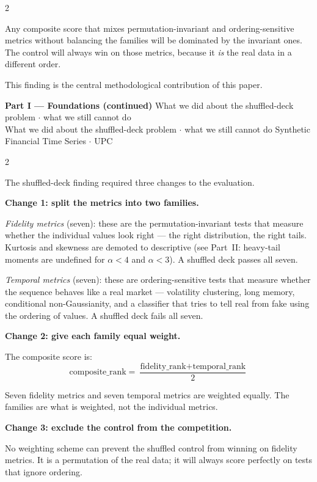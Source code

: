 \documentclass[10pt]{article}
\newcommand{\tealbox}[2]{\begin{tcolorbox}[mybox={Teal}{LBg},title={#1}]#2\end{tcolorbox}}
\newcommand{\pagehead}[2]{%
  \begin{tcolorbox}[enhanced,arc=0pt,outer arc=0pt,boxrule=0pt,
    colback=Navy,colframe=Navy,
    top=5pt,bottom=5pt,left=8pt,right=8pt,
    before skip=0pt,after skip=10pt]
  {\color{white}\large\bfseries #1}%
  \ifx\relax#2\relax\else\\[1pt]{\color{blue!30!white}\small #2}\fi
  \hfill{\color{blue!20!white}\footnotesize Synthetic Financial Time Series $\cdot$ UPC}
  \end{tcolorbox}}
\begin{document}
\begin{multicols}{2}
{Any composite score that mixes permutation-invariant and ordering-sensitive metrics without balancing the families will be dominated by the invariant ones. The control will always win on those metrics, because it \emph{is} the real data in a different order.

\smallskip
This finding is the central methodological contribution of this paper.}

\end{multicols}

\clearpage

\pagehead{Part I --- Foundations (continued)}
         {What we did about the shuffled-deck problem $\cdot$ what we still cannot do}

\begin{multicols}{2}

\tealbox{8\quad What We Did About It}{%
The shuffled-deck finding required three changes to the evaluation.

\medskip
\textbf{Change 1: split the metrics into two families.}

\textit{Fidelity metrics} (seven): these are the permutation-invariant tests that measure whether the individual values look right --- the right distribution, the right tails. Kurtosis and skewness are demoted to descriptive (see Part~II: heavy-tail moments are undefined for $\alpha < 4$ and $\alpha < 3$). A shuffled deck passes all seven.

\textit{Temporal metrics} (seven): these are ordering-sensitive tests that measure whether the sequence behaves like a real market --- volatility clustering, long memory, conditional non-Gaussianity, and a classifier that tries to tell real from fake using the ordering of values. A shuffled deck fails all seven.

\medskip
\textbf{Change 2: give each family equal weight.}

The composite score is:
\begin{equation*}
  \text{composite\_rank} = \frac{\text{fidelity\_rank} + \text{temporal\_rank}}{2}
\end{equation*}

Seven fidelity metrics and seven temporal metrics are weighted equally. The families are what is weighted, not the individual metrics.

\medskip
\textbf{Change 3: exclude the control from the competition.}

No weighting scheme can prevent the shuffled control from winning on fidelity metrics. It is a permutation of the real data; it will always score perfectly on tests that ignore ordering.

}
\end{multicols}
\end{document}
